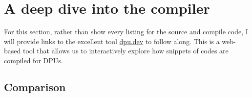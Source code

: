 \chapter{A deep dive into the compiler}






For this section, rather than show every listing for the source and compile code, I will provide links to the excellent tool \url{dpu.dev} to follow along. This is a web-based tool that allows us to interactively explore how snippets of codes are compiled for DPUs.

\section{Comparison}
\label{annex:comparison}

